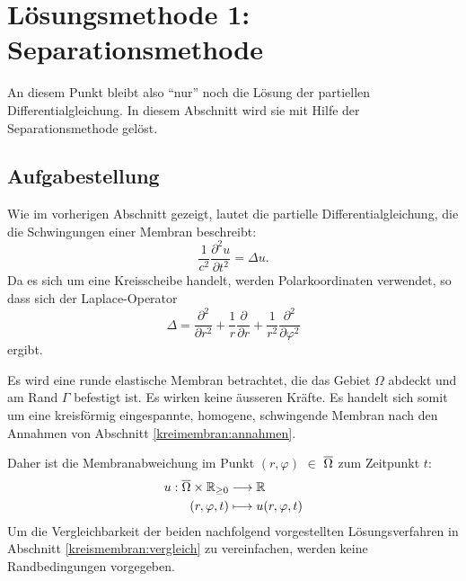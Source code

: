 %
%


\section{Lösungsmethode 1: Separationsmethode 
	\label{kreismembran:section:teil1}}
An diesem Punkt bleibt also ``nur'' noch die Lösung der partiellen Differentialgleichung. In diesem Abschnitt wird sie mit Hilfe der Separationsmethode gelöst.
%

\subsection{Aufgabestellung\label{sub:aufgabestellung}}
Wie im vorherigen Abschnitt gezeigt, lautet die partielle Differentialgleichung, die die Schwingungen einer Membran beschreibt:
\begin{equation*}
	\frac{1}{c^2}\frac{\partial^2u}{\partial t^2} = \Delta u.
\end{equation*}
Da es sich um eine Kreisscheibe handelt, werden Polarkoordinaten verwendet, so dass sich der Laplace-Operator
%
%
\begin{equation*}
	\Delta
	=
	\frac{\partial^2}{\partial r^2}
	+
	\frac1r
	\frac{\partial}{\partial r}
	+
	\frac{1}{r^2}
	\frac{\partial^2}{\partial\varphi^2}
	\label{buch:pde:kreis:laplace}
\end{equation*}
ergibt.

Es wird eine runde elastische Membran betrachtet, die das Gebiet $\Omega$ abdeckt und am Rand $\Gamma$ befestigt ist.
Es wirken keine äusseren Kräfte.
Es handelt sich somit um eine kreisförmig eingespannte, homogene, schwingende
Membran nach den Annahmen von Abschnitt \ref{kreimembran:annahmen}.

Daher ist die Membranabweichung im Punkt $(r,\varphi)$ $\in$ $\overline{\rm \Omega}$ zum Zeitpunkt $t$:
\begin{align*}
	u: \overline{\rm \Omega} \times \mathbb{R}_{\geq 0} &\longrightarrow \mathbb{R}\\
	(r,\varphi,t) &\longmapsto u(r,\varphi,t)
\end{align*}
Um die Vergleichbarkeit der beiden nachfolgend vorgestellten Lösungsverfahren in Abschnitt \ref{kreismembran:vergleich} zu vereinfachen, werden keine Randbedingungen vorgegeben.

